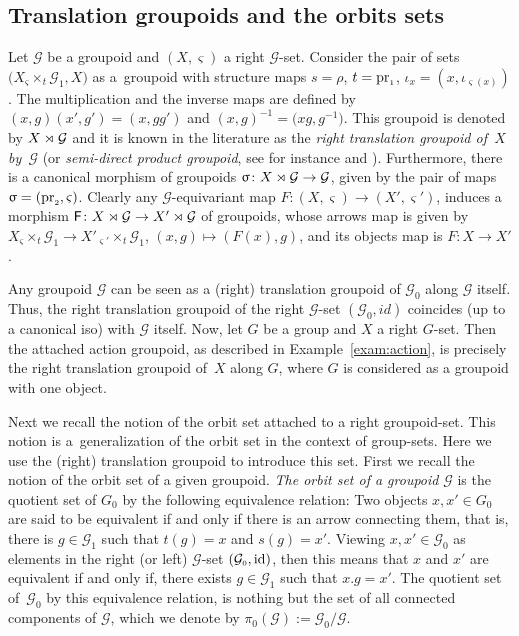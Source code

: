 \documentclass[pdftex]{sigma}
\numberwithin{equation}{section}
\newcommand{\Sf}[1]{\mathsf{#1}}
\newcommand{\Go}{\cG_{\Sscript{0}}}
\newcommand{\Ga}{\cG_{\Sscript{1}}}
\newcommand{\cG}{{\mathcal G}}
\newcommand{\Sscript}[1]{\scriptscriptstyle{#1}}
\newcommand{\due}[3]{{}_{{#2 }} {#1}_{{ #3}} }
\begin{document}
\begin{Example}
\end{Example}

\subsection{Translation groupoids and the orbits sets}\label{ssec:Grpd12}
 Let $\cG$ be a groupoid and $(X,\varsigma)$ a right $\cG$-set. Consider the pair of sets $\big( X \due \times {\Sscript{\varsigma}} { \Sscript{{t}}} \Ga, X \big)$ as a~groupoid with structure maps ${s}=\rho$, $t={\rm pr}_{\Sscript{1}}$, $\iota_{\Sscript{x}}=(x,\iota_{\varsigma(x)})$. The multiplication and the inverse maps are defined by $(x,g)(x',g')=(x,gg')$ and $(x,g)^{-1}=\big(xg,g^{-1}\big)$. This groupoid is denoted by $X \rJoin \cG$ and it is known in the literature as the \emph{right translation groupoid of~$X$ by~$\cG$} (or \emph{semi-direct product groupoid}, see for instance \cite[p.~163]{Moedijk/Mrcun:2005} and \cite{Kaoutit/Kowalzig:14}). Furthermore, there is a canonical morphism of groupoids $\upsigma\colon X\rJoin \cG \to \cG$, given by the pair of maps $\upsigma=({\rm pr}_{\Sscript{2}}, \varsigma)$. Clearly any $\cG$-equivariant map $F\colon (X,\varsigma) \to (X',\varsigma')$, induces a morphism $\Sf{F}\colon X \rJoin \cG \to X' \rJoin \cG$ of groupoids, whose arrows map is given by $X \due \times {\Sscript{\varsigma}} { \Sscript{{t}}} \Ga \to X' \due \times {\Sscript{\varsigma'}} { \Sscript{{t}}} \Ga $, $(x, g) \mapsto (F(x), g)$, and its objects map is $F\colon X \to X'$.

\begin{Example}\label{exam:refereePacience}Any groupoid $\cG$ can be seen as a (right) translation groupoid of $\Go$ along $\cG$ itself. Thus, the right translation groupoid of the right $\cG$-set $(\Go, id)$ coincides (up to a canonical iso) with $\cG$ itself. Now, let $G$ be a group and $X$ a right $G$-set. Then the attached action groupoid, as described in Example~\ref{exam:action}, is precisely the right translation groupoid of~$X$ along $G$, where $G$ is considered as a groupoid with one object.
\end{Example}

Next we recall the notion of the orbit set attached to a right groupoid-set. This notion is a~generalization of the orbit set in the context of group-sets. Here we use the (right) translation groupoid to introduce this set.
First we recall the notion of the orbit set of a given groupoid. \emph{The orbit set of a groupoid} $\cG$ is the quotient set of $G_{\Sscript{0}}$ by the following equivalence relation: Two objects $x, x' \in G_{\Sscript{0}}$ are said to be equivalent if and only if there is an arrow connecting them, that is, there is $g \in\Ga$ such that $t(g)=x$ and $s(g)=x'$. Viewing $x, x' \in \Go$ as elements in the right (or left) $\cG$-set $(\Go, {\rm id})$, then this means that $x$ and $x'$ are equivalent if and only if, there exists $g \in \Ga$ such that $x . g=x'$. The quotient set of~$\Go$ by this equivalence relation, is nothing but the set of all connected components of $\cG$, which we denote by $\pi_{\Sscript{0}}(\cG):=\Go/\cG$.
\end{document}
